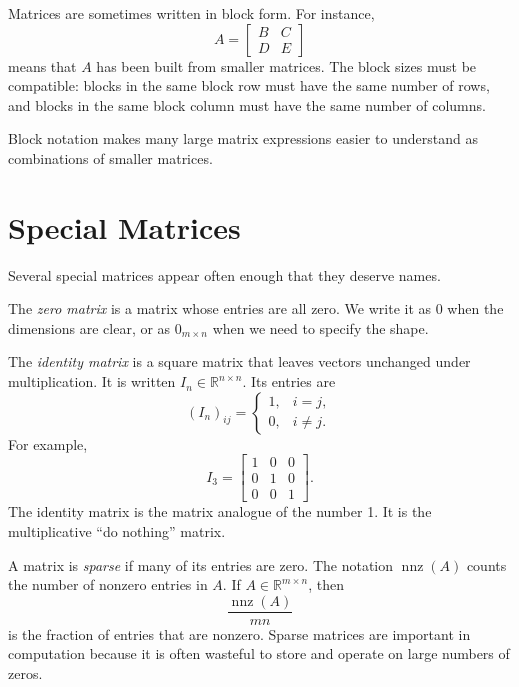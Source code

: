 Matrices are sometimes written in block form. For instance,
\[
    A=
    \begin{bmatrix}
        B & C\\
        D & E
    \end{bmatrix}
\]
means that \(A\) has been built from smaller matrices. The block sizes must be compatible: blocks in the same block row must have the same number of rows, and blocks in the same block column must have the same number of columns.

Block notation makes many large matrix expressions easier to understand as combinations of smaller matrices.

\section{Special Matrices}
\label{mf:special-matrices}
\label{mf:matrices-special}
\label{mf:identity-matrix}

Several special matrices appear often enough that they deserve names.

The \emph{zero matrix} is a matrix whose entries are all zero. We write it as \(0\) when the dimensions are clear, or as \(0_{m\times n}\) when we need to specify the shape.

The \emph{identity matrix} is a square matrix that leaves vectors unchanged under multiplication. It is written \(I_n\in\mathbb{R}^{n\times n}\). Its entries are
\[
    (I_n)_{ij}= 
    \begin{cases}
        1, & i=j,\\
        0, & i\neq j.
    \end{cases}
\]
For example,
\[
    I_3=
    \begin{bmatrix}
        1 & 0 & 0\\
        0 & 1 & 0\\
        0 & 0 & 1
    \end{bmatrix}.
\]
The identity matrix is the matrix analogue of the number 1. It is the multiplicative ``do nothing'' matrix.

A matrix is \emph{sparse} if many of its entries are zero. The notation \(\operatorname{nnz}(A)\) counts the number of nonzero entries in \(A\). If \(A\in\mathbb{R}^{m\times n}\), then
\[
    \frac{\operatorname{nnz}(A)}{mn}
\]
is the fraction of entries that are nonzero. Sparse matrices are important in computation because it is often wasteful to store and operate on large numbers of zeros.

